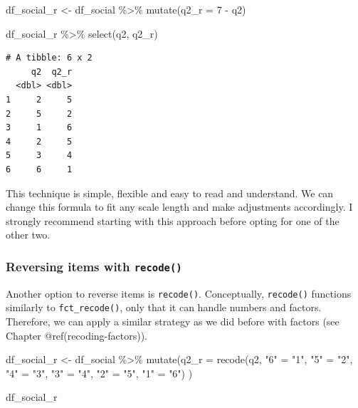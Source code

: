 \documentclass[
  letterpaper,
]{krantz}
\makeatletter
\newenvironment{Shaded}{\begin{snugshade}}{\end{snugshade}}
\newcommand{\AttributeTok}[1]{\textcolor[rgb]{0.40,0.45,0.13}{#1}}
\newcommand{\DecValTok}[1]{\textcolor[rgb]{0.68,0.00,0.00}{#1}}
\newcommand{\FunctionTok}[1]{\textcolor[rgb]{0.28,0.35,0.67}{#1}}
\newcommand{\NormalTok}[1]{\textcolor[rgb]{0.00,0.23,0.31}{#1}}
\newcommand{\OtherTok}[1]{\textcolor[rgb]{0.00,0.23,0.31}{#1}}
\newcommand{\SpecialCharTok}[1]{\textcolor[rgb]{0.37,0.37,0.37}{#1}}
\newcommand{\StringTok}[1]{\textcolor[rgb]{0.13,0.47,0.30}{#1}}
\newenvironment{kframe}{%
\medskip{}
\setlength{\fboxsep}{.8em}
 \def\at@end@of@kframe{}%
 \ifinner\ifhmode%
  \def\at@end@of@kframe{\end{minipage}}%
  \begin{minipage}{\columnwidth}%
 \fi\fi%
 \def\FrameCommand##1{\hskip\@totalleftmargin \hskip-\fboxsep
 \colorbox{shadecolor}{##1}\hskip-\fboxsep
     \hskip-\linewidth \hskip-\@totalleftmargin \hskip\columnwidth}%
 \MakeFramed {\advance\hsize-\width
   \@totalleftmargin\z@ \linewidth\hsize
   \@setminipage}}%
 {\par\unskip\endMakeFramed%
 \at@end@of@kframe}
\renewenvironment{Shaded}{\begin{kframe}}{\end{kframe}}
\makeatother
\begin{document}
\begin{Shaded}
\begin{Highlighting}[]
\NormalTok{df\_social\_r }\OtherTok{\textless{}{-}}
\NormalTok{  df\_social }\SpecialCharTok{\%\textgreater{}\%}
  \FunctionTok{mutate}\NormalTok{(}\AttributeTok{q2\_r =} \DecValTok{7} \SpecialCharTok{{-}}\NormalTok{ q2)}

\NormalTok{df\_social\_r }\SpecialCharTok{\%\textgreater{}\%}
  \FunctionTok{select}\NormalTok{(q2, q2\_r)}
\end{Highlighting}
\end{Shaded}

\begin{verbatim}
# A tibble: 6 x 2
     q2  q2_r
  <dbl> <dbl>
1     2     5
2     5     2
3     1     6
4     2     5
5     3     4
6     6     1
\end{verbatim}

This technique is simple, flexible and easy to read and understand. We
can change this formula to fit any scale length and make adjustments
accordingly. I strongly recommend starting with this approach before
opting for one of the other two.

\subsubsection{\texorpdfstring{Reversing items with
\texttt{recode()}}{Reversing items with recode()}}\label{reversing-items-recode}

Another option to reverse items is \texttt{recode()}. Conceptually,
\texttt{recode()} functions similarly to \texttt{fct\_recode()}, only
that it can handle numbers and factors. Therefore, we can apply a
similar strategy as we did before with factors (see Chapter
@ref(recoding-factors)).

\begin{Shaded}
\begin{Highlighting}[]
\NormalTok{df\_social\_r }\OtherTok{\textless{}{-}}
\NormalTok{  df\_social }\SpecialCharTok{\%\textgreater{}\%}
  \FunctionTok{mutate}\NormalTok{(}\AttributeTok{q2\_r =} \FunctionTok{recode}\NormalTok{(q2,}
                       \StringTok{"6"} \OtherTok{=} \StringTok{"1"}\NormalTok{,}
                       \StringTok{"5"} \OtherTok{=} \StringTok{"2"}\NormalTok{,}
                       \StringTok{"4"} \OtherTok{=} \StringTok{"3"}\NormalTok{,}
                       \StringTok{"3"} \OtherTok{=} \StringTok{"4"}\NormalTok{,}
                       \StringTok{"2"} \OtherTok{=} \StringTok{"5"}\NormalTok{,}
                       \StringTok{"1"} \OtherTok{=} \StringTok{"6"}\NormalTok{)}
\NormalTok{         )}

\NormalTok{df\_social\_r}
\end{Highlighting}
\end{Shaded}
\end{document}
